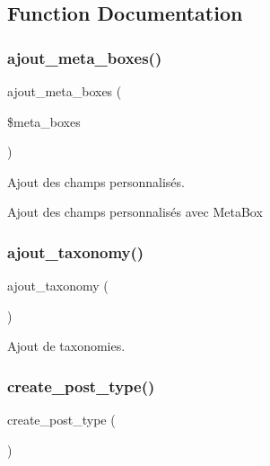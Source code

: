 \subsection{Function Documentation}
\hypertarget{functions_8php_aea51bb810ad63c0c020915c08fff675e}{}\label{functions_8php_aea51bb810ad63c0c020915c08fff675e} 
\subsubsection{\texorpdfstring{ajout\+\_\+meta\+\_\+boxes()}{ajout\_meta\_boxes()}}
{\footnotesize\ttfamily ajout\+\_\+meta\+\_\+boxes (\begin{DoxyParamCaption}\item[{}]{\$meta\+\_\+boxes }\end{DoxyParamCaption})}



Ajout des champs personnalisés. 

Ajout des champs personnalisés avec Meta\+Box \hypertarget{functions_8php_a082ce3c9f404dc0998106017b82ae9ba}{}\label{functions_8php_a082ce3c9f404dc0998106017b82ae9ba} 
\subsubsection{\texorpdfstring{ajout\+\_\+taxonomy()}{ajout\_taxonomy()}}
{\footnotesize\ttfamily ajout\+\_\+taxonomy (\begin{DoxyParamCaption}{ }\end{DoxyParamCaption})}



Ajout de taxonomies. 

\hypertarget{functions_8php_ad04a983b8ad9dfafb94434ffcac2e6ef}{}\label{functions_8php_ad04a983b8ad9dfafb94434ffcac2e6ef} 
\subsubsection{\texorpdfstring{create\+\_\+post\+\_\+type()}{create\_post\_type()}}
{\footnotesize\ttfamily create\+\_\+post\+\_\+type (\begin{DoxyParamCaption}{ }\end{DoxyParamCaption})}



